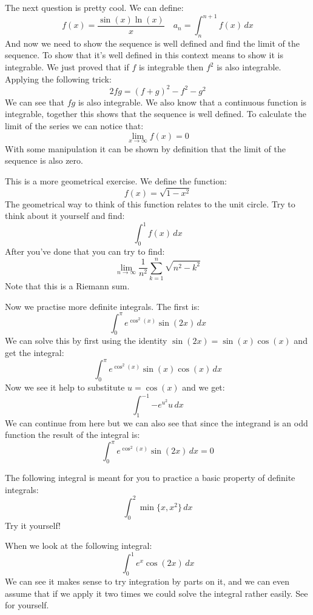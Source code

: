 \documentclass[11pt,a4paper]{article}
\begin{document}
	\newpage
	
	The next question is pretty cool. We can define:
	\[
		f(x) = \frac{\sin (x) \ln(x)}{x} \quad
		a_n  = \int_{n}^{n+1}{f(x)\,dx}
	\]
	And now we need to show the sequence is well defined and find the limit
	of the sequence. To show that it's well defined in this context means to
	show it is integrable. We just proved that if $f$ is integrable then
	$f^2$ is also integrable. Applying the following trick:
	\[
		2fg = (f+g)^2 - f^2 - g^2
	\]
	We can see that $fg$ is also integrable. We also know that a continuous
	function is integrable, together this shows that the sequence is well
	defined. To calculate the limit of the series we can notice that:
	\[
		\lim_{x\to\infty}{f(x)} = 0
	\]
	With some manipulation it can be shown by definition that the limit of
	the sequence is also zero.
	
	\newpage
	
	This is a more geometrical exercise. We define the function:
	\[
		f(x) = \sqrt{1-x^2}
	\]
	The geometrical way to think of this function relates to the unit circle.
	Try to think about it yourself and find:
	\[
		\int_{0}^{1}{f(x)\,dx}
	\]
	After you've done that you can try to find:
	\[
		\lim_{n\to\infty}{\frac{1}{n^2}\sum_{k=1}^{n}{\sqrt{n^2-k^2}}}
	\]
	Note that this is a Riemann sum.
	
	\newpage
	
	Now we practise more definite integrals. The first is:
	\[
		\int_{0}^{\pi}{e^{\cos^2(x)}\sin(2x)\,dx}
	\]
	We can solve this by first using the identity $\sin(2x)=\sin(x)\cos(x)$
	and get the integral:
	\[
		\int_{0}^{\pi}{e^{\cos^2(x)}\sin(x)\cos(x)\,dx}
	\]
	Now we see it help to substitute $u = \cos(x)$ and we get:
	\[
		\int_{1}^{-1}{-e^{u^2}u\,dx}
	\]
	We can continue from here but we can also see that since the integrand
	is an odd function the result of the integral is:
	\[
		\int_{0}^{\pi}{e^{\cos^2(x)}\sin(2x)\,dx} = 0
	\]
	
	\newpage
	
	The following integral is meant for you to practice a basic property
	of definite integrals:
	\[
		\int_{0}^{2}{\min\{x,x^2\}\,dx}
	\]
	Try it yourself!
	
	\newpage
	
	When we look at the following integral:
	\[
		\int_{0}^{1}{e^x\cos(2x)\,dx}
	\]
	We can see it makes sense to try integration by parts on it, and we
	can even assume that if we apply it two times we could solve the integral
	rather easily. See for yourself.
	
\end{document}
